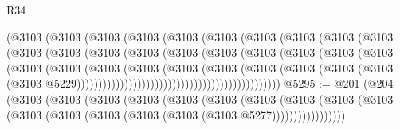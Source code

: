\begin{lexlean}{R34}
\begin{coremodule}
                                    (@3103
                                      (@3103
                                        (@3103
                                          (@3103
                                            (@3103
                                              (@3103
                                                (@3103
                                                  (@3103
                                                    (@3103
                                                      (@3103
                                                        (@3103
                                                          (@3103
                                                            (@3103
                                                              (@3103
                                                                (@3103
                                                                  (@3103
                                                                    (@3103
                                                                      (@3103
                                                                        (@3103
                                                                          (@3103
                                                                            (@3103
                                                                              (@3103
                                                                                (@3103
                                                                                  (@3103
                                                                                    (@3103
                                                                                      (@3103
                                                                                        (@3103
                                                                                          (@3103
                                                                                            (@3103
                                                                                              (@3103
                                                                                                (@3103
                                                                                                  @5229)))))))))))))))))))))))))))))))))))))))))))))))
@5295 := @201
    (@204
      (@3103
        (@3103
          (@3103
            (@3103
              (@3103
                (@3103
                  (@3103
                    (@3103
                      (@3103 (@3103 (@3103 (@3103 (@3103 (@3103 (@3103 (@3103 @5277)))))))))))))))))

\end{coremodule}
\end{lexlean}
